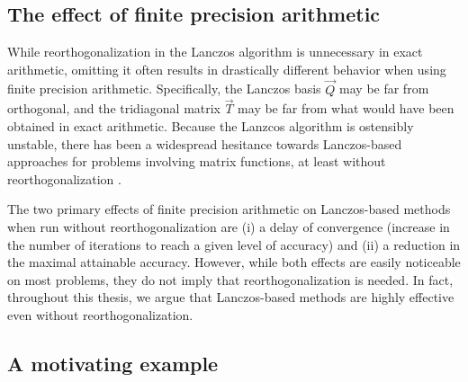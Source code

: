 \subsection{The effect of finite precision arithmetic}

While reorthogonalization in the Lanczos algorithm is unnecessary in exact arithmetic, omitting it often results in drastically different behavior when using finite precision arithmetic.
Specifically, the Lanczos basis \( \vec{Q} \) may be far from orthogonal, and the tridiagonal matrix \( \vec{T} \) may be far from what would have been obtained in exact arithmetic.
Because the Lanzcos algorithm is ostensibly unstable, there has been a widespread hesitance towards Lanczos-based approaches for problems involving matrix functions, at least without reorthogonalization \cite{jaklic_prelovsek_94,silver_roeder_voter_kress_96,aichhorn_daghofer_evertz_vondelinden_03,weisse_wellein_alvermann_fehske_06,ubaru_chen_saad_17,granziol_wan_garipov_19}.

The two primary effects of finite precision arithmetic on Lanczos-based methods when run without reorthogonalization are (i) a delay of convergence (increase in the number of iterations to reach a given level of accuracy) and (ii) a reduction in the maximal attainable accuracy.
However, while both effects are easily noticeable on most problems, they do not imply that reorthogonalization is needed.
In fact, throughout this thesis, we argue that Lanczos-based methods are highly effective even without reorthogonalization.







\subsection{A motivating example}

